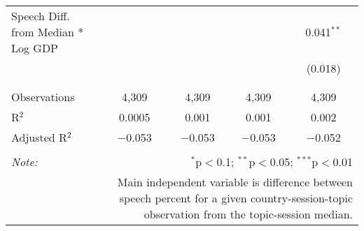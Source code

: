 \begin{table}[!htbp]
\begin{tabular}{@{\extracolsep{5pt}}lcccc}
 Speech Diff. from Median * Log GDP &  &  &  & 0.041$^{**}$ \\ 
  &  &  &  & (0.018) \\ 
  & & & & \\ 
\hline \\[-1.8ex] 
Observations & 4,309 & 4,309 & 4,309 & 4,309 \\ 
R$^{2}$ & 0.0005 & 0.001 & 0.001 & 0.002 \\ 
Adjusted R$^{2}$ & $-$0.053 & $-$0.053 & $-$0.053 & $-$0.052 \\ 
\hline 
\hline \\[-1.8ex] 
\textit{Note:}  & \multicolumn{4}{r}{$^{*}$p$<$0.1; $^{**}$p$<$0.05; $^{***}$p$<$0.01} \\ 
 & \multicolumn{4}{r}{Main independent variable is difference between speech percent for a given country-session-topic observation from the topic-session median.} \\ 
\end{tabular} 
\end{table} 
